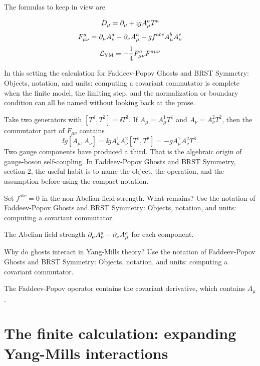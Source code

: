 The formulas to keep in view are

\[
  D_\mu=\partial_\mu+\mathrm i gA_\mu^aT^a
\]
\[
  F_{\mu\nu}^a=\partial_\mu A_\nu^a-\partial_\nu A_\mu^a-gf^{abc}A_\mu^bA_\nu^c
\]
\[
  \mathcal L_{\mathrm{YM}}=-\frac14F_{\mu\nu}^aF^{a\mu\nu}
\]

In this setting the calculation for Faddeev-Popov Ghosts and BRST Symmetry: Objects, notation, and units: computing a covariant commutator is complete when the finite model, the limiting step, and the normalization or boundary condition can all be named without looking back at the prose.




\begin{example}
Take two generators with \([T^1,T^2]=\ii T^3\).  If \(A_\mu=A_\mu^1T^1\) and \(A_\nu=A_\nu^2T^2\), then the commutator part of \(F_{\mu\nu}\) contains
\[
  \ii g[A_\mu,A_\nu]=\ii gA_\mu^1A_\nu^2[T^1,T^2]=-gA_\mu^1A_\nu^2T^3.
\]
Two gauge components have produced a third.  That is the algebraic origin of gauge-boson self-coupling.  In Faddeev-Popov Ghosts and BRST Symmetry, section 2, the useful habit is to name the object, the operation, and the assumption before using the compact notation.
\end{example}



\begin{exercise}
Set \(f^{abc}=0\) in the non-Abelian field strength.  What remains?  Use the notation of Faddeev-Popov Ghosts and BRST Symmetry: Objects, notation, and units: computing a covariant commutator.
\begin{answer}
The Abelian field strength \(\partial_\mu A_\nu^a-\partial_\nu A_\mu^a\) for each component.
\end{answer}
\end{exercise}

\begin{exercise}
Why do ghosts interact in Yang-Mills theory?  Use the notation of Faddeev-Popov Ghosts and BRST Symmetry: Objects, notation, and units: computing a covariant commutator.
\begin{answer}
The Faddeev-Popov operator contains the covariant derivative, which contains \(A_\mu\).
\end{answer}
\end{exercise}



\section{The finite calculation: expanding Yang-Mills interactions}

